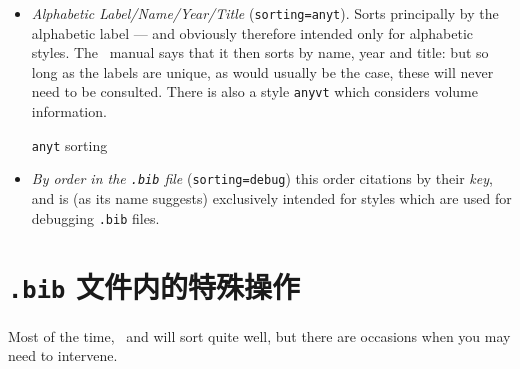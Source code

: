 \begin{itemize}
\begin{marginfigure}[1ex]
{\begin{minipage}{0.95\marginparwidth}
    \end{minipage}}
  \vspace{3pt}
\caption{\texttt{ynt} sorting}
\end{marginfigure}
\item
  \emph{Alphabetic Label/Name/Year/Title} (\texttt{sorting=anyt}). Sorts
  principally by the alphabetic label --- and obviously therefore
  intended only for alphabetic styles. The \biblatex~manual says that it
  then sorts by name, year and title: but so long as the labels are
  unique, as would usually be the case, these will never need to be
  consulted. There is also a style \texttt{anyvt} which
  considers volume information.
 \begin{marginfigure}[1ex]
\vspace{3pt}
  \caption{\texttt{anyt} sorting}
  \end{marginfigure}
\item \emph{By order in the \texttt{.bib} file}
  (\texttt{sorting=debug}) this order citations by their \emph{key},
  and is (as its name suggests) exclusively intended for styles which
  are used for debugging \texttt{.bib} files.
\end{itemize}

\section{\texttt{.bib} 文件内的特殊操作}

Most of the time, \biblatex\ and  will sort quite well,
but there are occasions when you may need to intervene.

